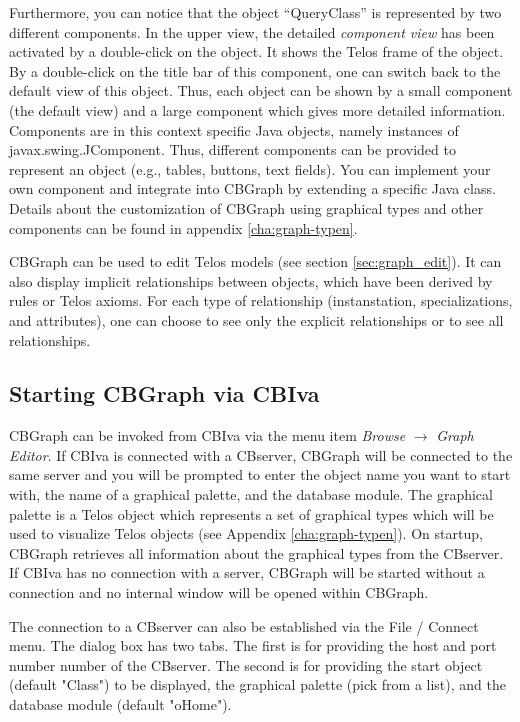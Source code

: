 Furthermore, you can notice that the object ``QueryClass'' is represented
by two different components. In the upper view, the detailed {\em component view}
has been activated by a double-click on the object. It shows the Telos
frame of the object. By a double-click on the title bar of this component,
one can switch back to the default view of this object. Thus, each object
can be shown by a small component (the default view) and a large
component which gives more detailed information. Components are in this
context specific Java objects, namely instances of javax.swing.JComponent.
Thus, different components can be provided to represent an object (e.g.,
tables, buttons, text fields). You can implement your own component
and integrate into CBGraph by extending a specific Java class.
Details about the customization of CBGraph using graphical
types and other components can be found in appendix \ref{cha:graph-typen}.

CBGraph can be used to edit Telos models (see section
\ref{sec:graph_edit}). It can also display implicit
relationships between objects, which have been derived by rules or Telos
axioms. For each type of relationship (instanstation, specializations, and
attributes), one can choose to see only the explicit relationships or to see
all relationships.

\subsection{Starting CBGraph via CBIva}

CBGraph can be invoked from CBIva
via the menu item {\em Browse} $\rightarrow$ {\em Graph Editor}.
If CBIva is connected with a CBserver, CBGraph will be
connected to the same server and you will be prompted to enter the object
name you want to start with, the name of a graphical palette, and the database module. The
graphical palette is a Telos object which represents a set of
graphical types which will be used to visualize Telos objects (see
Appendix \ref{cha:graph-typen}). On startup, CBGraph
retrieves all information about the graphical types from the CBserver.
If CBIva has no connection with
a server, CBGraph will be started without a connection
and no internal window will be opened within CBGraph.

The connection to a CBserver can also be established via the File / Connect
menu. The dialog box has two tabs. The first is for providing the host
and port number number of the CBserver. The second is for providing the 
start object (default "Class") to be displayed, the graphical palette (pick from
a list), and the database module (default "oHome").

